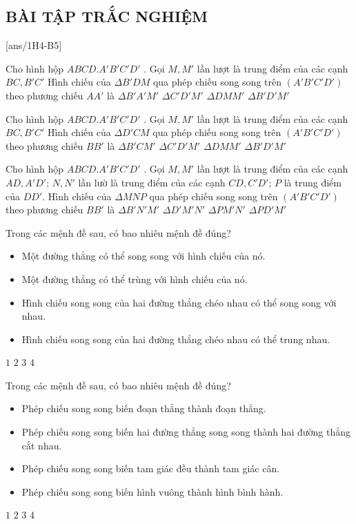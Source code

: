 \NOTE
\subsection{BÀI TẬP TRẮC NGHIỆM}

[ans/1H4-B5]
\setcounter{ex}{0}
\begin{ex}
	Cho hình hộp $ABCD.A'B'C'D'$  . Gọi $M, M'$   lần lượt là trung điểm của các cạnh $BC, B'C'$  Hình chiếu của $\Delta B'DM$  qua phép chiếu song song trên $(A'B'C'D')$  theo phương chiếu $AA'$   là
	\choice
	{$\Delta B'A'M'$}
		{$\Delta C'D'M'$}
			{$\Delta DMM'$}
				{\True$\Delta B'D'M'$}
\end{ex}
\begin{ex}
		Cho hình hộp $ABCD.A'B'C'D'$  . Gọi $M, M'$   lần lượt là trung điểm của các cạnh $BC, B'C'$  Hình chiếu của $\Delta D'CM$  qua phép chiếu song song trên $(A'B'C'D')$  theo phương chiếu $BB'$   là
	\choice
	{$\Delta B'CM'$}
	{\True$\Delta C'D'M'$}
	{$\Delta DMM'$}
	{$\Delta B'D'M'$}
\end{ex}
\begin{ex}
	Cho hình hộp $ABCD.A'B'C'D'$  . Gọi $M, M'$   lần lượt là trung điểm của các cạnh $AD, A'D'$; $N, N'$ lần lườ là trung điểm của các cạnh $CD, C'D'$; $P$ là trung điểm của $DD'$.  Hình chiếu của $\Delta MNP$  qua phép chiếu song song trên $(A'B'C'D')$  theo phương chiếu $BB'$   là
	\choice
	{$\Delta B'N'M'$}
	{\True$\Delta D'M'N'$}
	{$\Delta PM'N'$}
	{$\Delta PD'M'$}
\end{ex}
\begin{ex}
	Trong các mệnh đề sau, có bao nhiêu mệnh đề đúng?
	\begin{itemize}
		\item [a)] Một đường thẳng có thể song song với hình chiếu của nó.
		\item [b)] Một đường thẳng có thể trùng với hình chiếu của nó.
		\item [c)] Hình chiếu song song của hai đường thẳng chéo nhau có thể song song với nhau.
		\item [d)]Hình chiếu song song của hai đường thẳng chéo nhau có thể trung nhau.
	\end{itemize}
\choice
{$1$}
{$2$}
{$3$}
{$4$}
\end{ex}
\begin{ex}
	Trong các mệnh đề sau, có bao nhiêu mệnh đề đúng?
	\begin{itemize}
		\item [a)] Phép chiếu song song biến đoạn thẳng thành đoạn thẳng.
		\item [b)] Phép chiếu song song biến hai đường thẳng song song thành hai đường thẳng cắt nhau.
		\item [c)] Phép chiếu song song biến tam giác đều thành tam giác cân.
		\item [d)] Phép chiếu song song biến hình vuông thành hình bình hành.
	\end{itemize}
	\choice
	{$1$}
	{$2$}
	{$3$}
	{$4$}
\end{ex}

